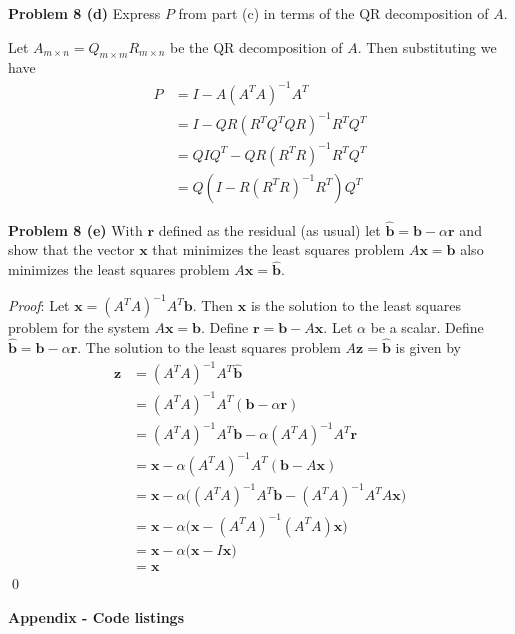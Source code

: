 \documentclass[12pt]{article}
\newcommand{\problem}[1]{\hspace{-4 ex} \large \textbf{Problem #1} }
\renewenvironment{proof}{\hspace{-4 ex} \emph{Proof}:}{\qed}
\begin{document}
\bigbreak

\problem{8 (d)} Express $P$ from part (c) in terms of the QR decomposition of $A$. \bigbreak

Let $A_{m \times n} = Q_{m \times m} R_{m \times n}$ be the QR decomposition of $A$. Then substituting we have
\begin{align*}
	P & = I - A (A^TA)^{-1}A^T \\
	& = I - QR (R^TQ^TQR)^{-1}R^TQ^T \\
	& = QIQ^T - QR (R^TR)^{-1}R^TQ^T \\
	& = Q(I - R (R^TR)^{-1}R^T)Q^T
\end{align*}

\bigbreak

\problem{8 (e)} With $\mathbf{r}$ defined as the residual (as usual) let $\hat{\mathbf{b}} = \mathbf{b} - \alpha \mathbf{r}$ and show that the vector $\mathbf{x}$ that minimizes the least squares problem $A\mathbf{x} = \mathbf{b}$ also minimizes the least squares problem $A\mathbf{x} = \hat{\mathbf{b}}$.

\begin{proof}
	Let $\mathbf{x} = (A^TA)^{-1}A^T\mathbf{b}$. Then $\mathbf{x}$ is the solution to the least squares problem for the system $A\mathbf{x} = \mathbf{b}$. Define $\mathbf{r} = \mathbf{b} - A \mathbf{x}$. Let $\alpha$ be a scalar. Define $\hat{\mathbf{b}} = \mathbf{b} - \alpha \mathbf{r}$. The solution to the least squares problem $A\mathbf{z} = \hat{\mathbf{b}}$ is given by
	\begin{align*}
		\mathbf{z} & = (A^TA)^{-1}A^T \hat{\mathbf{b}} \\
		& = (A^TA)^{-1}A^T (\mathbf{b} - \alpha \mathbf{r}) \\
		& = (A^TA)^{-1}A^T \mathbf{b} - \alpha (A^TA)^{-1}A^T \mathbf{r} \\
		& = \mathbf{x} - \alpha (A^TA)^{-1}A^T (\mathbf{b} - A \mathbf{x}) \\
		& = \mathbf{x} - \alpha \big(  (A^TA)^{-1}A^T \mathbf{b} - (A^TA)^{-1}A^T A \mathbf{x} \big) \\
		& = \mathbf{x} - \alpha \big(  \mathbf{x} - (A^TA)^{-1}(A^T A) \mathbf{x} \big) \\
		& = \mathbf{x} - \alpha \big(  \mathbf{x} - I \mathbf{x} \big) \\
		& = \mathbf{x}
	\end{align*}
\end{proof}

\bigbreak

{\hspace{-4 ex} \large \textbf{Appendix - Code listings}}\bigbreak
\end{document}
